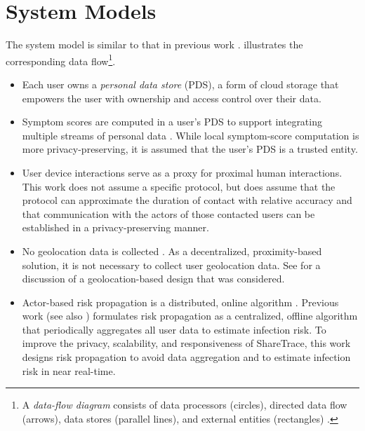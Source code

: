 \section{System Models} %


The system model is similar to that in previous work \cite{Ayday2020, Ayday2021}.  illustrates the corresponding data flow\footnote{A \emph{data-flow diagram} consists of data processors (circles), directed data flow (arrows), data stores (parallel lines), and external entities (rectangles) \cite[pp. 437--438]{Fowler2004}\label{foot:dataflow}.}.
%
\begin{itemize}
    \item Each user owns a \emph{personal data store} (PDS), a form of cloud storage that empowers the user with ownership and access control over their data.
    \item Symptom scores are computed in a user's PDS to support integrating multiple streams of personal data \cite{Ayday2020}. While local symptom-score computation \cite{Ayday2020, Ayday2021} is more privacy-preserving, it is assumed that the user's PDS is a trusted entity.
    \item User device interactions serve as a proxy for proximal human interactions. This work does not assume a specific protocol, but does assume that the protocol can approximate the duration of contact with relative accuracy and that communication with the actors of those contacted users can be established in a privacy-preserving manner.
    \item No geolocation data is collected \cite{Ayday2020}. As a decentralized, proximity-based solution, it is not necessary to collect user geolocation data. See  for a discussion of a geolocation-based design that was considered.
    \item Actor-based risk propagation is a distributed, online algorithm \cite[pp. 791--818]{Cormen2022}. Previous work \cite{Ayday2020, Ayday2021} (see also ) formulates risk propagation as a centralized, offline algorithm that periodically aggregates all user data to estimate infection risk. To improve the privacy, scalability, and responsiveness of ShareTrace, this work designs risk propagation to avoid data aggregation and to estimate infection risk in near real-time.
\end{itemize}

